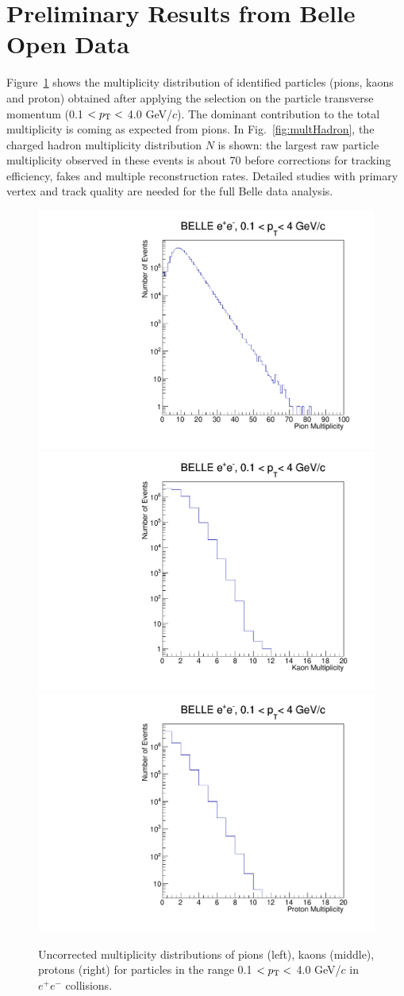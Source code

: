 \section{Preliminary Results from Belle Open Data}

Figure~\ref{fig:multPID} shows the multiplicity distribution of identified particles (pions, kaons and proton) obtained after 
applying the selection on the particle transverse momentum (0.1 $<p_{\rm T}<$ 4.0 GeV/$c$). 
The dominant contribution to the total multiplicity is coming as expected from pions.
In Fig.~\ref{fig:multHadron}, the charged hadron multiplicity distribution $N$ is shown: the largest raw particle multiplicity observed in these events is about 70 before corrections for tracking efficiency, fakes and multiple reconstruction rates. Detailed studies with primary vertex and track quality are needed for the full Belle data analysis.

\begin{figure}[!htb]
\begin{center}
\includegraphics[width=.32\textwidth]{figures/pion_mult.pdf}
\includegraphics[width=.32\textwidth]{figures/kaon_mult.pdf}
\includegraphics[width=.32\textwidth]{figures/proton_mult.pdf}
\caption{Uncorrected multiplicity distributions of pions (left), kaons (middle), protons (right) for  particles in the range  0.1 $<p_{\rm T}<$ 4.0 GeV/$c$ in $e^{+}e^{-}$ collisions. }
\label{fig:multPID} 
\end{center}
\end{figure}

